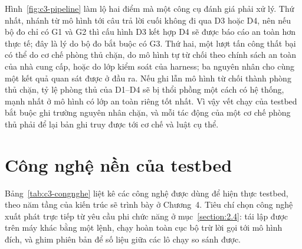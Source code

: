 \documentclass[../DoAn.tex]{subfiles}
\begin{document}
Hình~\ref{fig:c3-pipeline} làm lộ hai điểm mà một công cụ đánh giá phải xử lý. Thứ nhất, nhánh từ mô hình tới câu trả lời cuối không đi qua D3 hoặc D4, nên nếu bộ đo chỉ có G1 và G2 thì cấu hình D3 kết hợp D4 sẽ được báo cáo an toàn hơn thực tế; đây là lý do bộ đo bắt buộc có G3. Thứ hai, một lượt tấn công thất bại có thể do cơ chế phòng thủ chặn, do mô hình tự từ chối theo chính sách an toàn của nhà cung cấp, hoặc do lớp kiểm soát của harness; ba nguyên nhân cho cùng một kết quả quan sát được ở đầu ra. Nếu ghi lẫn mô hình từ chối thành phòng thủ chặn, tỷ lệ phòng thủ của D1--D4 sẽ bị thổi phồng một cách có hệ thống, mạnh nhất ở mô hình có lớp an toàn riêng tốt nhất. Vì vậy vết chạy của testbed bắt buộc ghi trường nguyên nhân chặn, và mỗi tác động của một cơ chế phòng thủ phải để lại bản ghi truy được tới cơ chế và luật cụ thể.

\section{Công nghệ nền của testbed}
\label{section:3.6}

Bảng~\ref{tab:c3-congnghe} liệt kê các công nghệ được dùng để hiện thực testbed, theo năm tầng của kiến trúc sẽ trình bày ở Chương~4. Tiêu chí chọn công nghệ xuất phát trực tiếp từ yêu cầu phi chức năng ở mục~\ref{section:2.4}: tái lập được trên máy khác bằng một lệnh, chạy hoàn toàn cục bộ trừ lời gọi tới mô hình đích, và ghim phiên bản để số liệu giữa các lô chạy so sánh được.
\end{document}
